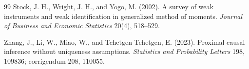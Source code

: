 \documentclass[11pt]{article}
\theoremstyle{definition}
\theoremstyle{plain}
\theoremstyle{remark}
\begin{document}
\begin{thebibliography}{99}
Stock, J. H., Wright, J. H., and Yogo, M. (2002).
A survey of weak instruments and weak identification in generalized method of
moments.
\textit{Journal of Business and Economic Statistics} 20(4), 518--529.

Zhang, J., Li, W., Miao, W., and Tchetgen Tchetgen, E. (2023).
Proximal causal inference without uniqueness assumptions.
\textit{Statistics and Probability Letters} 198, 109836; corrigendum 208,
110055.
\end{thebibliography}
\end{document}

